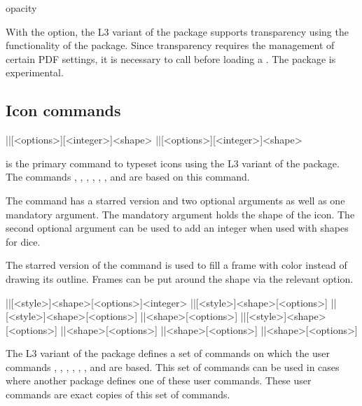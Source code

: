 \documentclass[a4paper]{article}
\begin{document}
\label{macro:opacity}
\begin{macrodef}opacity\end{macrodef}
With the  option, the L3 variant of the package supports transparency using the functionality of the  package. Since transparency requires the management of certain PDF settings, it is necessary to call \macro{\DocumentMetadata{}} before loading a \macro{\documentclass}. The  package is experimental.

\subsection{Icon commands}

\begin{macrodef}
|\DndIconsUseIcon|[<options>][<integer>]{<shape>}
|\DndIconsUseIcon*|[<options>][<integer>]{<shape>}
\end{macrodef}
\macro{\DndIconsUseIcon} is the primary command to typeset icons using the L3 variant of the package. The commands \macro{\die}, \macro{\ability}, \macro{\saving}, \macro{\spell}, \macro{\spellschool}, \macro{\damage}, \macro{\attack} and \macro{\condition} are based on this command. 

The \macro{\DndIconsUseIcon} command has a starred version and two optional arguments as well as one mandatory argument. The mandatory argument holds the shape of the icon. The second optional argument can be used to add an integer when used with shapes for dice.

The starred version of the command is used to fill a frame with color instead of drawing its outline. Frames can be put around the shape via the relevant  option. 

\begin{macrodef}
|\DndiconsDie|[<style>]{<shape>}[<options>]{<integer>}
|\DndiconsAbiliy|[<style>]{<shape>}[<options>]
|\DndiconsSaving|[<style>]{<shape>}[<options>]
|\DndiconsSpell|{<shape>}[<options>]
|\DndiconsSpellschool|[<style>]{<shape>}[<options>]
|\DndiconsDamage|{<shape>}[<options>]
|\DndiconsAttack|{<shape>}[<options>]
|\DndiconsCondition|{<shape>}[<options>]
\end{macrodef}
The L3 variant of the package defines a set of commands on which the user commands \macro{\die}, \macro{\ability}, \macro{\saving}, \macro{\spell}, \macro{\spellschool}, \macro{\damage}, \macro{\attack} and \macro{\condition} are based. This set of commands can be used in cases where another package defines one of these user commands. These user commands are exact copies of this set of commands.
\end{document}

